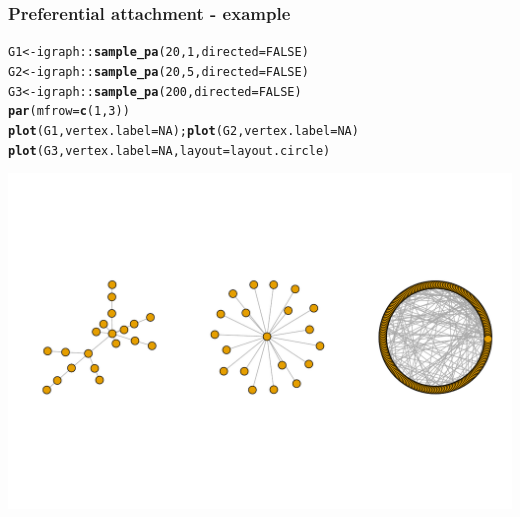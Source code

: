 \documentclass{beamer}\usepackage[]{graphicx}\usepackage[]{color}
\makeatletter
\newcommand{\hlnum}[1]{\textcolor[rgb]{0.686,0.059,0.569}{#1}}%
\newcommand{\hlopt}[1]{\textcolor[rgb]{0,0,0}{#1}}%
\newcommand{\hlstd}[1]{\textcolor[rgb]{0.345,0.345,0.345}{#1}}%
\newcommand{\hlkwb}[1]{\textcolor[rgb]{0.69,0.353,0.396}{#1}}%
\newcommand{\hlkwc}[1]{\textcolor[rgb]{0.333,0.667,0.333}{#1}}%
\newcommand{\hlkwd}[1]{\textcolor[rgb]{0.737,0.353,0.396}{\textbf{#1}}}%
\newenvironment{kframe}{%
 \def\at@end@of@kframe{}%
 \ifinner\ifhmode%
  \def\at@end@of@kframe{\end{minipage}}%
  \begin{minipage}{\columnwidth}%
 \fi\fi%
 \def\FrameCommand##1{\hskip\@totalleftmargin \hskip-\fboxsep
 \colorbox{shadecolor}{##1}\hskip-\fboxsep
     \hskip-\linewidth \hskip-\@totalleftmargin \hskip\columnwidth}%
 \MakeFramed {\advance\hsize-\width
   \@totalleftmargin\z@ \linewidth\hsize
   \@setminipage}}%
 {\par\unskip\endMakeFramed%
 \at@end@of@kframe}
\newenvironment{knitrout}{}{} %
\makeatother
\begin{document}
\begin{frame}[fragile]
  \frametitle{Preferential attachment - example}

\begin{knitrout}\scriptsize
{}\color{fgcolor}\begin{kframe}
\begin{alltt}
\hlstd{G1} \hlkwb{<-} \hlstd{igraph}\hlopt{::}\hlkwd{sample_pa}\hlstd{(}\hlnum{20}\hlstd{,} \hlnum{1}\hlstd{,} \hlkwc{directed}\hlstd{=}\hlnum{FALSE}\hlstd{)}
\hlstd{G2} \hlkwb{<-} \hlstd{igraph}\hlopt{::}\hlkwd{sample_pa}\hlstd{(}\hlnum{20}\hlstd{,} \hlnum{5}\hlstd{,} \hlkwc{directed}\hlstd{=}\hlnum{FALSE}\hlstd{)}
\hlstd{G3} \hlkwb{<-} \hlstd{igraph}\hlopt{::}\hlkwd{sample_pa}\hlstd{(}\hlnum{200}\hlstd{,} \hlkwc{directed}\hlstd{=}\hlnum{FALSE}\hlstd{)}
\hlkwd{par}\hlstd{(}\hlkwc{mfrow}\hlstd{=}\hlkwd{c}\hlstd{(}\hlnum{1}\hlstd{,}\hlnum{3}\hlstd{))}
\hlkwd{plot}\hlstd{(G1,} \hlkwc{vertex.label}\hlstd{=}\hlnum{NA}\hlstd{) ;} \hlkwd{plot}\hlstd{(G2,} \hlkwc{vertex.label}\hlstd{=}\hlnum{NA}\hlstd{)}
\hlkwd{plot}\hlstd{(G3,} \hlkwc{vertex.label}\hlstd{=}\hlnum{NA}\hlstd{,} \hlkwc{layout}\hlstd{=layout.circle)}
\end{alltt}
\end{kframe}
\includegraphics[width=.8\textwidth]{figures/PA_example-1} 
\end{knitrout}

\end{frame}
\end{document}
